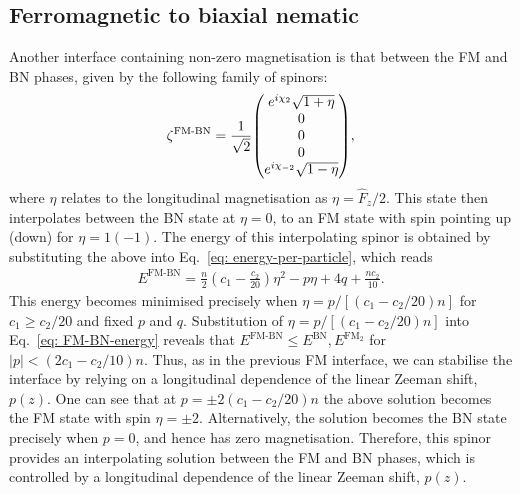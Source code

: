\subsection{Ferromagnetic to biaxial nematic}
Another interface containing non-zero magnetisation is that between the FM and
BN phases, given by the following family of spinors:
\begin{align}\label{eq: FM-BN-interpolating-spinor}
    \zeta^\text{FM-BN} = \frac{1}{\sqrt{2}}\mqty(
    e^{i\chi_2} \sqrt{1 + \eta} \\
    0 \\
    0 \\
    0 \\
    e^{i\chi_{-2}} \sqrt{1 - \eta}),
\end{align}
where \(\eta \) relates to the longitudinal magnetisation as \(\eta =
\hat{F}_z / 2\).
This state then interpolates between the BN state at \(\eta = 0\), to an FM
state with spin pointing up (down) for \(\eta = 1 (-1)\).
The energy of this interpolating spinor is obtained by substituting the above
into Eq.~\eqref{eq: energy-per-particle}, which reads
\begin{align}\label{eq: FM-BN-energy}
    E^\text{FM-BN} = \frac{n}{2}\left(c_1-\frac{c_2}{20}\right)\eta^2
    - p \eta + 4q + \frac{nc_2}{10}.
\end{align}
This energy becomes minimised precisely when \(\eta = p / [(c_1-c_2/20)n]\) for
\(c_1 \geq c_2/20\) and fixed \(p\) and \(q\).
Substitution of \(\eta = p / [(c_1-c_2/20)n]\) into Eq.~\eqref{eq: FM-BN-energy}
reveals that \(E^\text{FM-BN} \leq E^\text{BN},
E^{\text{FM}_2}\) for \(|p| < (2c_1-c_2/10)n\).
Thus, as in the previous FM interface, we can stabilise the interface by relying
on a longitudinal dependence of the linear Zeeman shift, \(p(z)\).
One can see that at \(p = \pm 2(c_1-c_2/20)n\) the above solution becomes
the FM state with spin \(\eta = \pm 2\).
Alternatively, the solution becomes the BN state precisely when \(p=0\), and
hence has zero magnetisation.
Therefore, this spinor provides an interpolating solution between the
FM and BN phases, which is controlled by a longitudinal dependence of
the linear Zeeman shift, \(p(z)\).

